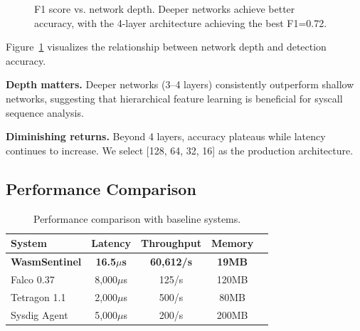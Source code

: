 \begin{figure}[t]
\centering
{}
\caption{F1 score vs. network depth. Deeper networks achieve better accuracy, with the 4-layer architecture achieving the best F1=0.72.}
\label{fig:architecture-search}
\end{figure}

Figure~\ref{fig:architecture-search} visualizes the relationship between network depth and detection accuracy.

\textbf{Depth matters.}
Deeper networks (3--4 layers) consistently outperform shallow networks, suggesting that hierarchical feature learning is beneficial for syscall sequence analysis.

\textbf{Diminishing returns.}
Beyond 4 layers, accuracy plateaus while latency continues to increase.
We select [128, 64, 32, 16] as the production architecture.

\subsection{Performance Comparison}
\label{sec:eval-performance}

\begin{table}[t]
\centering
\caption{Performance comparison with baseline systems.}
\label{tab:performance}
\begin{tabular}{lcccc}
\toprule
\textbf{System} & \textbf{Latency} & \textbf{Throughput} & \textbf{Memory} \\
\midrule
\textbf{WasmSentinel} & \textbf{16.5$\mu$s} & \textbf{60,612/s} & \textbf{19MB} \\
Falco 0.37 & 8,000$\mu$s & 125/s & 120MB \\
Tetragon 1.1 & 2,000$\mu$s & 500/s & 80MB \\
Sysdig Agent & 5,000$\mu$s & 200/s & 200MB \\
\bottomrule
\end{tabular}
\end{table}

